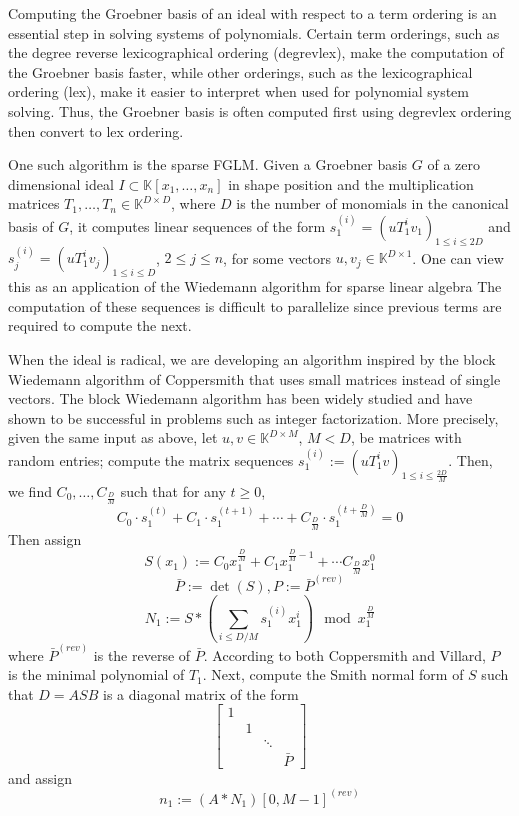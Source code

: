 \documentclass[12pt]{article}
\begin{document}
Computing the Groebner basis of an ideal with respect to a term ordering 
is an essential step in solving systems of polynomials.
Certain term orderings, such as the degree reverse lexicographical ordering (degrevlex),
make the computation of the Groebner basis faster, while other orderings, 
such as the lexicographical ordering (lex), make it easier to interpret when
used for polynomial system solving. Thus, the Groebner basis is often computed
first using degrevlex ordering then convert to lex ordering.

One such algorithm is the sparse FGLM. Given a Groebner basis $G$ of a zero 
dimensional ideal $I \subset \mathbb{K}[x_1, \dots, x_n]$ 
in shape position and the multiplication matrices $T_1,\dots, T_n \in \mathbb{K}^{D \times D}$,
where $D$ is the number of monomials in the canonical basis of $G$, it computes 
linear sequences of the form $s_1^{(i)} = (uT_1^iv_1)_{1\le i \le 2D}$ and
$s_j^{(i)} = (uT_1^iv_j)_{1\le i \le D}$, $2 \le j \le n$, for some vectors $u,v_j \in 
\mathbb{K}^{D\times 1}$. One can view this as an application of the Wiedemann algorithm 
for sparse linear algebra The computation of these sequences is difficult to parallelize 
since previous terms are required to compute the next. 

When the ideal is radical, we are developing an algorithm inspired by the block Wiedemann algorithm of Coppersmith
that uses small matrices instead of single vectors. The block Wiedemann algorithm has been 
widely studied and have shown to be successful in problems such as integer factorization.
More precisely, given the same input as above, let $u,v \in \mathbb{K}^{D \times M}$, $M < D$, be 
matrices with random entries; compute the matrix sequences $s_1^{(i)} := (uT_1^iv)_{1\le i \le \frac{2D}{M}}$. 
Then, we find $C_0, \dots, C_\frac{D}{M}$ such that for any $t \ge 0$,
$$ C_0 \cdot s_1^{(t)} + C_1 \cdot s_1^{(t+1)} + \cdots + C_{\frac{D}{M}} \cdot s_1^{(t+\frac{D}{M})}  = 0$$
Then assign
$$ S(x_1) := C_0  x_1^{\frac{D}{M}} + C_1  x_1^{\frac{D}{M} - 1} + \cdots C_{\frac{D}{M}} x_1^0$$
$$ \bar{P} := \det(S) , P := \bar{P}^{(rev)}$$
$$ N_1 := S * (\sum_{i\le D/M} s_1^{(i)} x_1^i) \mod x_1^{\frac{D}{M}}$$
where $\bar{P}^{(rev)}$ is the reverse of $\bar{P}$. According to both Coppersmith and Villard,
$P$ is the minimal polynomial of $T_1$. Next, compute the Smith normal form 
of $S$ such that $D = A S B$ is a diagonal matrix of the form
$$\begin{bmatrix}
	1 &  &        & \\
	  & 1&        &  \\ 
	  &  & \ddots & \\
	  &  &        & \bar{P}
\end{bmatrix}$$
and assign
$$ n_1 := (A*N_1)[0,M-1]^{(rev)}$$
\end{document}
